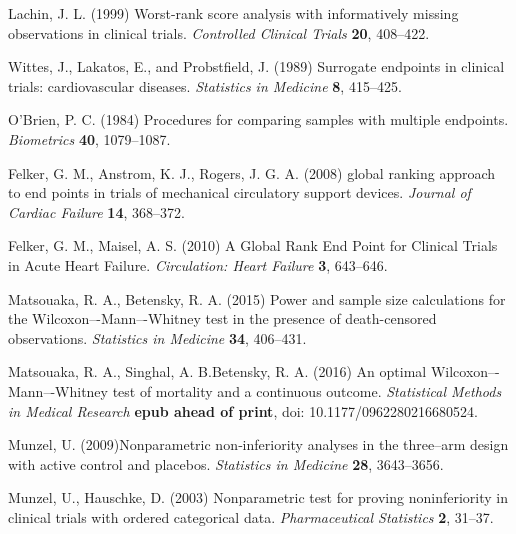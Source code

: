 \documentclass[bimj,fleqn]{w-art}
\theoremstyle{plain}
\theoremstyle{definition}
\begin{document}
\begin{thebibliography}{10}

 Lachin, J. L. (1999) Worst-rank score
analysis with informatively missing observations in clinical trials.
\textit{Controlled Clinical Trials} \textbf{20}, 408--422.

Wittes, J., Lakatos, E., and Probstfield, J. (1989) Surrogate endpoints in
clinical trials: cardiovascular diseases. \textit{Statistics in Medicine}
\textbf{8}, 415--425.

 O'Brien, P. C. (1984) Procedures
for comparing samples with multiple endpoints. \textit{Biometrics}
\textbf{40}, 1079--1087.

Felker, G. M., Anstrom, K. J., Rogers, J. G. A. (2008) global ranking approach
to end points in trials of mechanical circulatory support devices.
\textit{Journal of Cardiac Failure} \textbf{14}, 368--372.

 Felker, G. M.,
Maisel, A. S. (2010) A Global Rank End Point for Clinical Trials in Acute Heart
Failure. \textit{Circulation: Heart Failure} \textbf{3}, 643--646.

Matsouaka, R. A., Betensky, R. A. (2015) Power and sample size calculations for
the Wilcoxon–-Mann–-Whitney test in the presence of death-censored observations.
\textit{Statistics in Medicine} \textbf{34}, 406--431.

Matsouaka, R. A., Singhal, A. B.Betensky, R. A. (2016) An optimal
Wilcoxon–-Mann–-Whitney test of mortality and a continuous outcome.
\textit{Statistical Methods in Medical Research}
\textbf{epub ahead of print},  doi: 10.1177/0962280216680524.

Munzel, U. (2009)Nonparametric non‐inferiority analyses in the three--arm design
with active control and placebos.
\textit{Statistics in Medicine} \textbf{28}, 3643--3656.

Munzel, U., Hauschke, D. (2003) Nonparametric test for proving noninferiority in clinical trials with ordered categorical data.
\textit{Pharmaceutical Statistics} \textbf{2}, 31--37.


\end{thebibliography}
\end{document}
